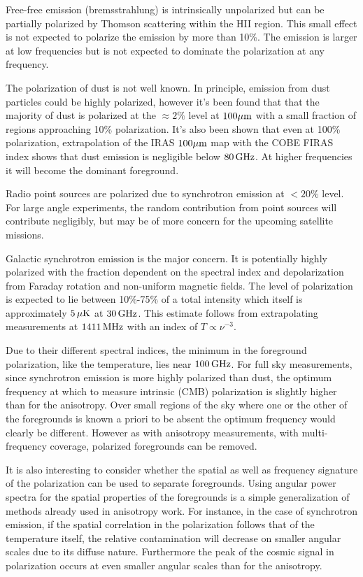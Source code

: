 \documentclass[a4paper,11pt]{article}
\begin{document}
{\noindent}Free-free emission (bremsstrahlung) is intrinsically unpolarized but can be partially polarized by Thomson scattering within the HII region. This small effect is not expected to polarize the emission by more than 10\%. The emission is larger at low frequencies but is not expected to dominate the polarization at any frequency.

{\noindent}The polarization of dust is not well known. In principle, emission from dust particles could be highly polarized, however it's been found that that the majority of dust is polarized at the $\approx2\%$ level at $100\mu{\rm m}$ with a small fraction of regions approaching 10\% polarization. It's also been shown that even at 100\% polarization, extrapolation of the IRAS $100\mu{\rm m}$ map with the COBE FIRAS index shows that dust emission is negligible below $80\,{\rm GHz}$. At higher frequencies it will become the dominant foreground.

{\noindent}Radio point sources are polarized due to synchrotron
emission at $<20\%$ level. For large angle experiments, the random contribution from point sources will contribute negligibly, but may be of more concern for the upcoming satellite missions.

{\noindent}Galactic synchrotron emission is the major concern. It is potentially highly polarized with the fraction dependent on the spectral index and depolarization from Faraday rotation and non-uniform magnetic fields. The level of polarization is expected to lie between 10\%-75\% of a total intensity which itself is approximately $5\,\mu{\rm K}$ at $30\,{\rm GHz}$. This estimate follows from extrapolating measurements at $1411\,{\rm MHz}$ with an index of $T\propto\nu^{-3}$.

{\noindent}Due to their different spectral indices, the minimum
in the foreground polarization, like the temperature, lies near $100\,{\rm GHz}$. For full sky measurements, since synchrotron emission is more highly polarized than dust, the optimum frequency at which to measure intrinsic (CMB) polarization is slightly higher than for the anisotropy. Over small regions of the sky where one or the other of the foregrounds is known a priori to be absent the optimum frequency would clearly be different. However as with anisotropy measurements, with multi-frequency coverage, polarized foregrounds can be
removed.

{\noindent}It is also interesting to consider whether the spatial as well as frequency signature of the polarization can be used to separate foregrounds. Using angular power spectra for the spatial properties of the foregrounds is a simple generalization of methods already used in anisotropy work. For instance, in the case of synchrotron emission, if the spatial correlation in the polarization follows that of the temperature itself, the relative contamination will decrease on smaller angular scales due to its diffuse nature. Furthermore the peak of the cosmic signal in polarization occurs at even smaller angular scales than for the anisotropy.
\end{document}
